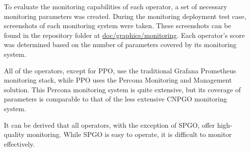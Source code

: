 To evaluate the monitoring capabilities of each operator, a set of necessary monitoring parameters was created. During the monitoring deployment test case, screenshots of each monitoring system were taken. These screenshots can be found in the repository folder at \url{doc/graphics/monitoring}. Each operator's score was determined based on the number of parameters covered by its monitoring system.

All of the operators, except for PPO, use the traditional Grafana Prometheus monitoring stack, while PPO uses the Percona Monitoring and Management solution. This Percona monitoring system is quite extensive, but its coverage of parameters is comparable to that of the less extensive CNPGO monitoring system.

It can be derived that all operators, with the exception of SPGO, offer high-quality monitoring. While SPGO is easy to operate, it is difficult to monitor effectively.



